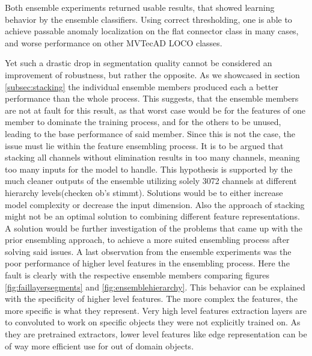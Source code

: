 Both ensemble experiments returned usable results, that showed learning behavior by the ensemble classifiers. Using correct thresholding, one is able to achieve passable 
anomaly localization on the flat connector class in many cases, and worse performance on other MVTecAD LOCO \cite{LOCODentsAndScratchesBergmann2022} classes.

Yet such a drastic drop in segmentation quality cannot be considered an improvement of robustness, but rather the opposite. As we showcased in 
section \ref{subsec:stacking} the individual ensemble members produced each a better performance than the whole process. 
This suggests, that the ensemble members are not at fault for this result, as that worst case would be for the features of one member to dominate the training process, 
and for the others to be unused, leading to the base performance of said member. Since this is not the case, the issue must lie within the feature ensembling process. 
It is to be argued that stacking all channels without elimination results in too many channels, meaning too many inputs for the model to handle. This hypothesis is 
supported by the much cleaner outputs of the ensemble utilizing solely 3072 channels at different hierarchy levels(checken ob's stimmt). Solutions would be to either 
increase model complexity or decrease the input dimension. Also the approach of stacking might not be an optimal solution to combining different feature representations. 
A solution would be further investigation of the problems that came up with the prior ensembling approach, to achieve a more suited ensembling process after solving said 
issues.
\newline
A last observation from the ensemble experiments was the poor performance of higher level features in the ensembling process. 
Here the fault is clearly with the respective ensemble members comparing figures \ref{fig:faillayersegments} and \ref{fig:ensemblehierarchy}. This behavior can be explained 
with the specificity of higher level features. The more complex the features, the more specific is what they represent. Very high level features extraction layers are to 
convoluted to work on specific objects they were not explicitly trained on. As they are pretrained extractors, lower level features like edge representation can be of way 
more efficient use for out of domain objects.





